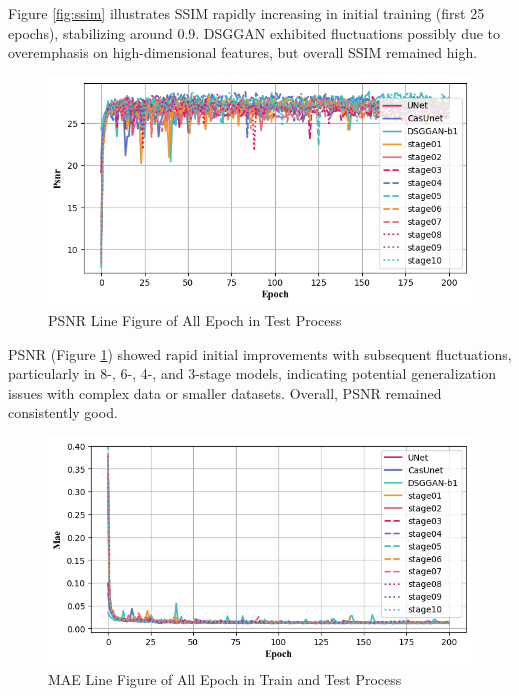 \documentclass[a4paper, times, 10pt,twocolumn]{article}
\begin{document}
Figure \ref{fig:ssim} illustrates SSIM rapidly increasing in initial training (first 25 epochs), stabilizing around 0.9. DSGGAN exhibited fluctuations possibly due to overemphasis on high-dimensional features, but overall SSIM remained high.

\begin{figure}[h]
	\centering
	\includegraphics[width=1.0\linewidth]{u-net/lung/csvimg_lung_mnv3/psnr_comparison.png}
	\caption[psnr]{PSNR Line Figure of All Epoch in Test Process}
	\label{fig:psnr}
\end{figure}

PSNR (Figure \ref{fig:psnr}) showed rapid initial improvements with subsequent fluctuations, particularly in 8-, 6-, 4-, and 3-stage models, indicating potential generalization issues with complex data or smaller datasets. Overall, PSNR remained consistently good.

\begin{figure}[h]
	\centering
	\includegraphics[width=1.0\linewidth]{u-net/lung/csvimg_lung_mnv3/mae_comparison.png}
	\caption[mae]{MAE Line Figure of All Epoch in Train and Test Process}
	\label{fig:mae}
\end{figure}
\end{document}
